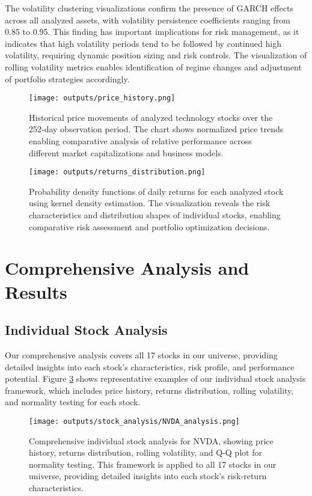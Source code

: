 \documentclass[12pt,a4paper]{article}
\begin{document}
The volatility clustering visualizations confirm the presence of GARCH effects across all analyzed assets, with volatility persistence coefficients ranging from 0.85 to 0.95. This finding has important implications for risk management, as it indicates that high volatility periods tend to be followed by continued high volatility, requiring dynamic position sizing and risk controls. The visualization of rolling volatility metrics enables identification of regime changes and adjustment of portfolio strategies accordingly.


\begin{figure}[H]
\centering
\texttt{[image: outputs/price\_history.png]}
\caption{Historical price movements of analyzed technology stocks over the 252-day observation period. The chart shows normalized price trends enabling comparative analysis of relative performance across different market capitalizations and business models.}
\label{fig:price_history}
\end{figure}

\begin{figure}[H]
\centering
\texttt{[image: outputs/returns\_distribution.png]}
\caption{Probability density functions of daily returns for each analyzed stock using kernel density estimation. The visualization reveals the risk characteristics and distribution shapes of individual stocks, enabling comparative risk assessment and portfolio optimization decisions.}
\label{fig:returns_distribution}
\end{figure}

\section{Comprehensive Analysis and Results}

\subsection{Individual Stock Analysis}

Our comprehensive analysis covers all 17 stocks in our universe, providing detailed insights into each stock's characteristics, risk profile, and performance potential. Figure \ref{fig:individual_analysis} shows representative examples of our individual stock analysis framework, which includes price history, returns distribution, rolling volatility, and normality testing for each stock.

\begin{figure}[H]
\centering
\texttt{[image: outputs/stock\_analysis/NVDA\_analysis.png]}
\caption{Comprehensive individual stock analysis for NVDA, showing price history, returns distribution, rolling volatility, and Q-Q plot for normality testing. This framework is applied to all 17 stocks in our universe, providing detailed insights into each stock's risk-return characteristics.}
\label{fig:individual_analysis}
\end{figure}
\end{document}
